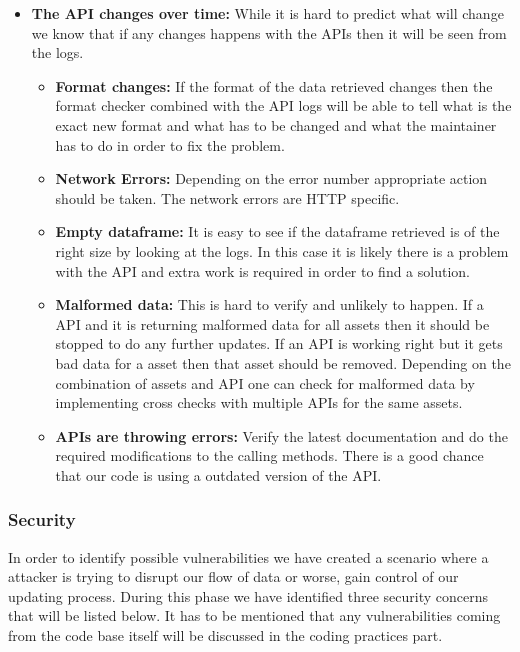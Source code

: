 \documentclass[main.tex]{subfiles}
\begin{document}
\begin{itemize}
    \item \textbf{The API changes over time: }
    While it is hard to predict what will change we know that if any changes happens with the APIs then it will be seen from the logs. 
    \begin{itemize}
        \item \textbf{Format changes:} If the format of the data retrieved changes then the format checker combined with the API logs will be able to tell what is the exact new format and what has to be changed and what the maintainer has to do in order to fix the problem.
        \item \textbf{Network Errors:}  Depending on the error number appropriate action should be taken. The network errors are HTTP specific. 
        \item \textbf{Empty dataframe:} It is easy to see if the dataframe retrieved is of the right size by looking at the logs. In this case it is likely there is a problem with the API and extra work is required in order to find a solution.
        \item \textbf{Malformed data:} This is  hard to verify and unlikely to happen.  If a API and it is returning malformed data for all assets then it should be stopped to do any further updates. If an API is working right but it gets bad data for a asset then that asset should be removed. Depending on the combination of assets and API one can check for malformed data  by implementing cross checks with multiple APIs for the same assets.
        \item \textbf{APIs are throwing errors:} Verify the latest documentation and do the required modifications to the calling methods. There is a good chance that our code is using a outdated version of the API.
    \end{itemize}
\end{itemize}

\subsubsection{Security}
In order to identify possible vulnerabilities we have created a scenario where a attacker is trying to disrupt our flow of data or worse, gain control of our updating process. During this phase we have identified three security concerns that will be listed below. It has to be mentioned that any vulnerabilities coming  from the code base itself will be discussed in the coding practices part.\newline
\end{document}
